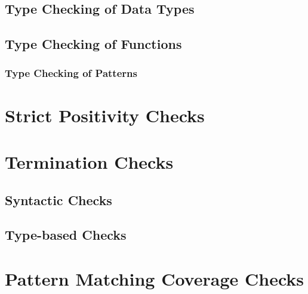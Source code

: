 \documentclass[acmsmall]{acmart}
\begin{document}
\subsection{Type Checking of Data Types}

\subsection{Type Checking of Functions}

\subsubsection{Type Checking of Patterns}
\label{sec:typeCheckPattern}

\section{Strict Positivity Checks}
\label{sec:spos}

\section{Termination Checks}
\label{sec:termination}

\subsection{Syntactic Checks}

\subsection{Type-based Checks}

\section{Pattern Matching Coverage Checks}
\label{sec:pattern}
\end{document}
